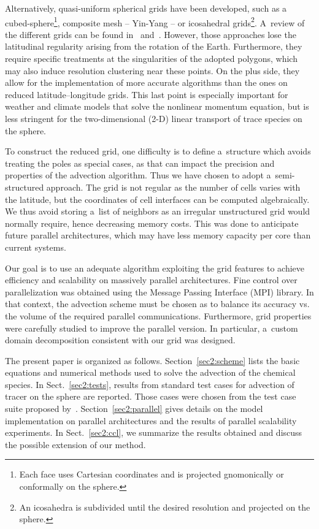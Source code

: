      Alternatively, quasi-uniform spherical grids have been developed,
     such as a cubed-sphere\footnote{Each face uses Cartesian
       coordinates and is projected gnomonically or conformally on the
       sphere.}, composite mesh -- Yin-Yang -- or icosahedral
     grids\footnote{An icosahedra is subdivided until the desired
       resolution and projected on the sphere.}. A~review of the
     different grids can be found in~\citet{Staniforth2012}
     and~\citet{Williamson2007}. However, those approaches lose the
     latitudinal regularity arising from the rotation of the Earth.
     Furthermore, they require specific treatments at the
     singularities of the adopted polygons, which may also induce
     resolution clustering near these points. On the plus side, they
     allow for the implementation of more accurate algorithms than the
     ones on reduced latitude--longitude grids. This last point is
     especially important for weather and climate models that solve
     the nonlinear momentum equation, but is less stringent for the
     two-dimensional (2-D) linear transport of trace species on the
     sphere.


     To construct the reduced grid, one difficulty is to define
     a~structure which avoids treating the poles as special cases, as
     that can impact the precision and properties of the advection
     algorithm. Thus we have chosen to adopt a~semi-structured
     approach. The grid is not regular as the number of cells varies
     with the latitude, but the coordinates of cell interfaces can be
     computed algebraically.  We thus avoid storing a~list of
     neighbors as an irregular unstructured grid would normally
     require, hence decreasing memory costs. This was done to
     anticipate future parallel architectures, which may have less
     memory capacity per core than current systems.

     Our goal is to use an adequate algorithm exploiting the grid
     features to achieve efficiency and scalability on massively
     parallel architectures. Fine control over parallelization was
     obtained using the Message Passing Interface (MPI) library.  In
     that context, the advection scheme must be chosen as to balance
     its accuracy vs. the volume of the required parallel communications.
     Furthermore, grid properties were carefully studied to improve
     the parallel version.  In particular, a~custom domain decomposition
     consistent with our grid was designed.

     The present paper is organized as follows. Section~\ref{sec2:scheme}
     lists the basic equations and numerical methods used to solve
     the advection of the chemical species. In Sect.~\ref{sec2:tests},
     results from standard test cases for advection of tracer on the
     sphere are reported. Those cases were chosen from the test case
     suite proposed by~\citet{Lauritzen2012}. Section~\ref{sec2:parallel}
     gives details on the model implementation on parallel
     architectures and the results of parallel scalability experiments. In
     Sect.~\ref{sec2:ccl}, we summarize the results obtained and discuss the
     possible extension of our method.


